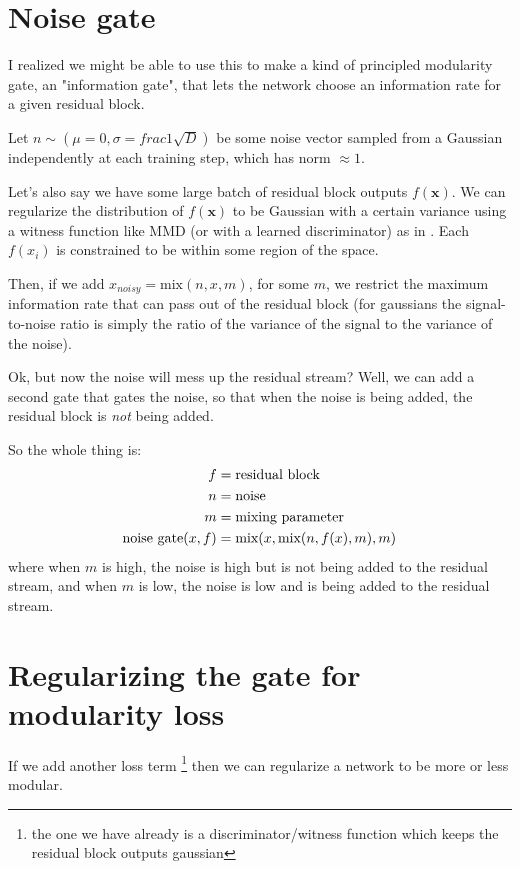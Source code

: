 \documentclass{article}
\begin{document}
\section{Noise gate}

I realized we might be able to use this to make a kind of principled modularity gate, an "information gate", that lets the network choose an information rate for a given residual block.

Let $n \sim (\mu = 0, \sigma = frac{1}{\sqrt{D}})$ be some noise vector sampled from a Gaussian independently at each training step, which has norm $\approx 1$.

Let's also say we have some large batch of residual block outputs $f(\mathbf{x})$. We can regularize the distribution of $f(\mathbf{x})$ to be Gaussian with a certain variance using a witness function like MMD (or with a learned discriminator) as in \cite{bir-vae}. Each $f(x_i)$ is constrained to be within some region of the space.

Then, if we add $x_{noisy} = \text{mix}(n, x, m)$, for some $m$, we restrict the maximum information rate that can pass out of the residual block (for gaussians the signal-to-noise ratio is simply the ratio of the variance of the signal to the variance of the noise).

Ok, but now the noise will mess up the residual stream? Well, we can add a second gate that gates the noise, so that when the noise is being added, the residual block is \textit{not} being added.

So the whole thing is:
\begin{align*}
    f &= \text{residual block} \\
    n &= \text{noise} \\
    m &= \text{mixing parameter} \\
    \text{noise gate}(x, f) &= \text{mix}(x, \text{\text{mix}}(n, f(x), m), m)
\end{align*}
where when $m$ is high, the noise is high but is not being added to the residual stream, and when $m$ is low, the noise is low and is being added to the residual stream.

\section{Regularizing the gate for modularity loss}

If we add another loss term \footnote{the one we have already is a discriminator/witness function which keeps the residual block outputs gaussian} then we can regularize a network to be more or less modular.
\end{document}
